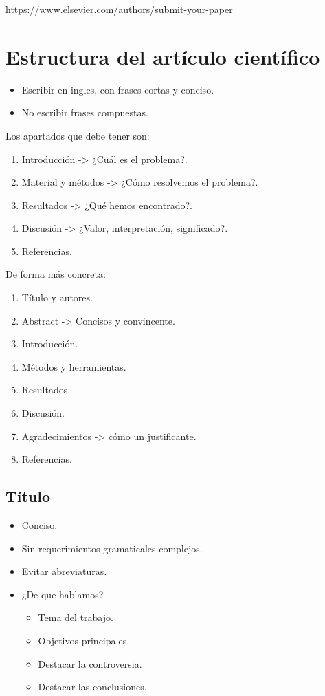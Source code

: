 \url{https://www.elsevier.com/authors/submit-your-paper}


\section{Estructura del artículo científico}

\begin{itemize}
    \item Escribir en ingles, con frases cortas y conciso.
    \item No escribir frases compuestas.
\end{itemize}

Los apartados que debe tener son:
\begin{enumerate}[1.]
    \item Introducción -> ¿Cuál es el problema?.
    \item Material y métodos -> ¿Cómo resolvemos el problema?.
    \item Resultados -> ¿Qué hemos encontrado?.
    \item Discusión -> ¿Valor, interpretación, significado?.
    \item Referencias.
\end{enumerate}

De forma más concreta:
\begin{enumerate}[1.]
    \item Título y autores.
    \item Abstract -> Concisos y convincente.
    \item Introducción.
    \item Métodos y herramientas.
    \item Resultados.
    \item Discusión.
    \item Agradecimientos -> cómo un justificante.
    \item Referencias.
\end{enumerate}

\subsection{Título}
\begin{itemize}
    \item Conciso.
    \item Sin requerimientos gramaticales complejos.
    \item Evitar abreviaturas.
    \item ¿De que hablamos?
	\begin{itemize}
	    \item Tema del trabajo.
	    \item Objetivos principales.
	    \item Destacar la controversia.
	    \item Destacar las conclusiones.
	\end{itemize}
\end{itemize}

